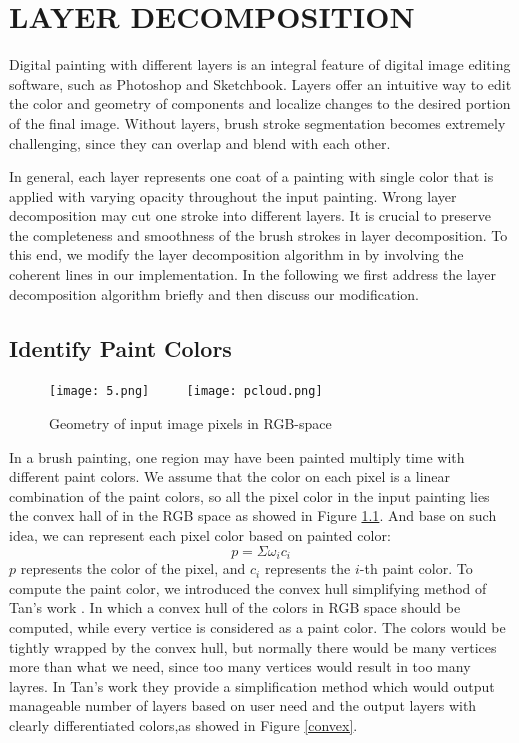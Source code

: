 \chapter{LAYER DECOMPOSITION}

Digital painting with different layers is an integral feature of digital image editing software, such as Photoshop and Sketchbook. Layers offer an intuitive way to edit the color and geometry of components and localize changes to the desired portion of the final image. Without layers, brush stroke segmentation becomes extremely challenging, since they can overlap and blend with each other.

In general, each layer represents one coat of a painting with single color that is applied with varying opacity throughout the input painting. Wrong layer decomposition may cut one stroke into different layers. It is crucial to preserve the completeness and smoothness of the brush strokes in layer decomposition. To this end, we modify the layer decomposition algorithm in  by involving the coherent lines \cite{kang2007coherent} in our implementation. In the following we first address the layer decomposition algorithm briefly and then discuss our modification. 


\section{Identify Paint Colors}

\begin{figure}[H]
	\centering
	\texttt{[image: 5.png]}
	~~~~
	\texttt{[image: pcloud.png]}
	\caption{Geometry of input image pixels in RGB-space}
	\label{point cloud}
\end{figure}

In a brush painting, one region may have been painted multiply time with different paint colors. We assume that the color on each pixel is a linear combination of the paint colors, so all the pixel color in the input painting lies the convex hall of in the RGB space as showed in Figure \ref{point cloud}. And base on such idea, we can represent each pixel color based on painted color: 
\begin{equation*}
p=\Sigma \omega_i c_i
\end{equation*}
$p$ represents the color of the pixel, and $c_i$ represents the $i$-th paint color. 
To compute the paint color, we introduced the convex hull simplifying method of Tan's work \cite{tan2016decomposing}. In which a convex hull of the colors in RGB space should be computed, while every vertice is considered as a paint color. The colors would be tightly wrapped by the convex hull, but normally there would be many vertices more than what we need, since too many vertices would result in too many layres. In Tan's work they provide a simplification method which would output manageable number of layers based on user need and the output layers with clearly differentiated colors,as showed in Figure \ref{convex}.

